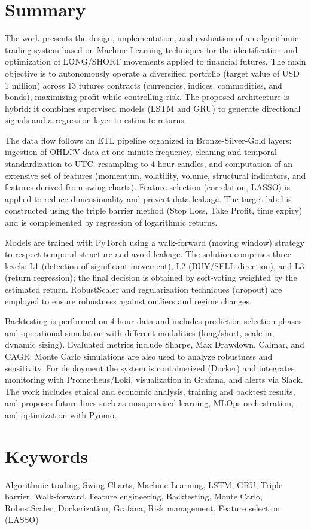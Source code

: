 \setlength{\parindent}{0em}

\section*{Summary}

The work presents the design, implementation, and evaluation of an algorithmic trading system based on Machine Learning techniques for the
identification and optimization of LONG/SHORT movements applied to financial futures. The main objective is to autonomously operate a diversified
portfolio (target value of USD 1 million) across 13 futures contracts (currencies, indices, commodities, and bonds), maximizing profit while
controlling risk. The proposed architecture is hybrid: it combines supervised models (LSTM and GRU) to generate directional signals and a regression
layer to estimate returns.

The data flow follows an ETL pipeline organized in Bronze-Silver-Gold layers: ingestion of OHLCV data at one-minute frequency, cleaning and temporal
standardization to UTC, resampling to 4-hour candles, and computation of an extensive set of features (momentum, volatility, volume, structural
indicators, and features derived from swing charts). Feature selection (correlation, LASSO) is applied to reduce dimensionality and prevent data
leakage. The target label is constructed using the triple barrier method (Stop Loss, Take Profit, time expiry) and is complemented by regression of
logarithmic returns.

Models are trained with PyTorch using a walk-forward (moving window) strategy to respect temporal structure and avoid leakage. The solution comprises
three levels: L1 (detection of significant movement), L2 (BUY/SELL direction), and L3 (return regression); the final decision is obtained by
soft-voting weighted by the estimated return. RobustScaler and regularization techniques (dropout) are employed to ensure robustness against outliers
and regime changes.

Backtesting is performed on 4-hour data and includes prediction selection phases and operational simulation with different modalities (long/short,
scale-in, dynamic sizing). Evaluated metrics include Sharpe, Max Drawdown, Calmar, and CAGR; Monte Carlo simulations are also used to analyze
robustness and sensitivity. For deployment the system is containerized (Docker) and integrates monitoring with Prometheus/Loki, visualization in
Grafana, and alerts via Slack. The work includes ethical and economic analysis, training and backtest results, and proposes future lines such as
unsupervised learning, MLOps orchestration, and optimization with Pyomo.

\section*{Keywords}

Algorithmic trading, Swing Charts, Machine Learning, LSTM, GRU, Triple barrier, Walk-forward, Feature engineering, Backtesting, Monte Carlo, RobustScaler, Dockerization, Grafana, Risk management, Feature selection (LASSO)